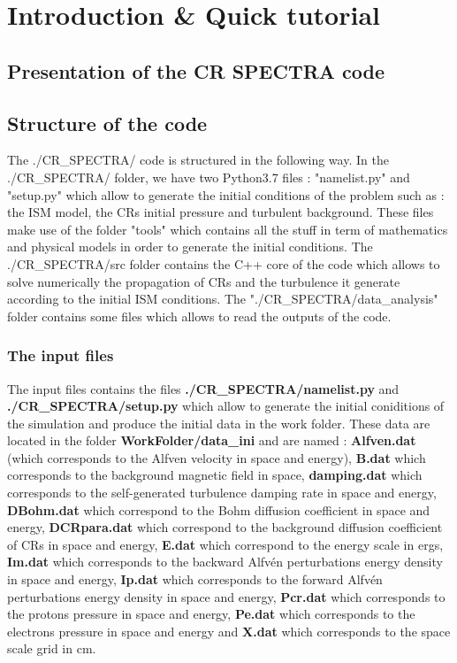 \section{Introduction \& Quick tutorial}


    \subsection{Presentation of the CR SPECTRA code}


    \subsection{Structure of the code}



        The ./CR\_SPECTRA/ code is structured in the following way. In the ./CR\_SPECTRA/ folder, we have two Python3.7 files : "namelist.py" and "setup.py" which allow to 
        generate the initial conditions of the problem such as : the ISM model, the CRs initial pressure and turbulent background. These files make use of the folder "tools" 
        which contains all the stuff in term of mathematics and physical models in order to generate the initial conditions. The ./CR\_SPECTRA/src folder contains the C++ core of 
        the code which allows to solve numerically the propagation of CRs and the turbulence it generate according to the initial ISM conditions. The "./CR\_SPECTRA/data\_analysis"
        folder contains some files which allows to read the outputs of the code. 

        \subsubsection{The input files}

            The input files contains the files {\bf{./CR\_SPECTRA/namelist.py}} and \\ {\bf{./CR\_SPECTRA/setup.py}} which allow to generate the initial coniditions of the 
            simulation and produce the initial data in the work folder. These data are located in the folder {\bf{WorkFolder/data\_ini}} and are named : {\bf{Alfven.dat}}
             (which corresponds to the Alfven velocity in space and energy), {\bf{B.dat}} which corresponds to the background magnetic field in space, 
            {\bf{damping.dat}} which corresponds to the self-generated turbulence damping rate in space and energy, 
            {\bf{DBohm.dat}} which correspond to the Bohm diffusion coefficient in space and energy, 
            {\bf{DCRpara.dat}} which correspond to the background diffusion coefficient of CRs in space and energy, 
            {\bf{E.dat}} which correspond to the energy scale in ergs, 
            {\bf{Im.dat}} which corresponds to the backward Alfvén perturbations energy density in space and energy,
             {\bf{Ip.dat}} which corresponds to the forward Alfvén perturbations energy density in space and energy, 
             {\bf{Pcr.dat}} which corresponds to the protons pressure in space and energy, 
             {\bf{Pe.dat}} which corresponds to the electrons pressure in space and energy and
            {\bf{X.dat}} which corresponds to the space scale grid in cm. \\ 

